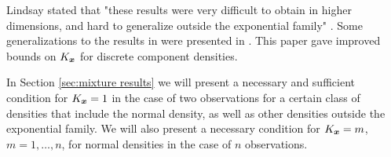 	Lindsay stated that "these results were very difficult to obtain in higher dimensions, and hard to generalize outside the exponential family" \cite{Lindsay1995-sq}. Some generalizations to the results in \cite{Lindsay1983a-he} were presented in \cite{Lindsay1993-rj}. This paper gave improved bounds on $K_{\bm{{x}}}$ for discrete component densities.

	In Section \ref{sec:mixture results} we will present a necessary and sufficient condition for $K_{\bm{{x}}} = 1$ in the case of two observations for a certain class of densities that include the normal density, as well as other densities outside the exponential family. We will also present a necessary condition for $K_{\bm{{x}}} = m$, $m = 1, \dots, n$, for normal densities in the case of $n$ observations.



	




